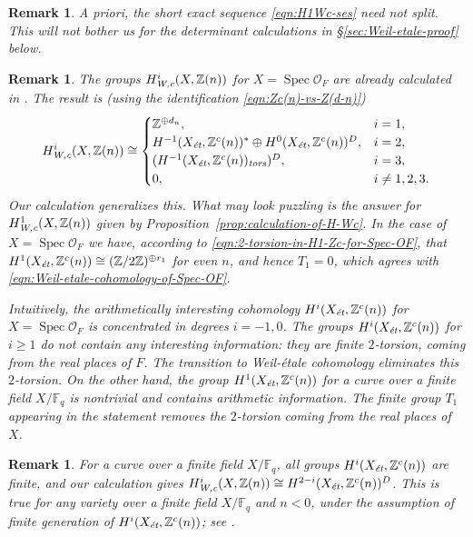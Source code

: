 \documentclass{article}
\DeclareMathOperator{\Spec}{Spec}
\newcommand{\FF}{\mathbb{F}}
\newcommand{\ZZ}{\mathbb{Z}}
\newcommand{\et}{\text{\it \'{e}t}}
\newcommand{\tors}{\text{\it tors}}
\newcommand{\Wc}{\text{\it W,c}}
\theoremstyle{myplain}
\theoremstyle{mydefinition}
\newtheorem{remark}[theorem]{Remark}
\begin{document}
\begin{remark}
  A priori, the short exact sequence \eqref{eqn:H1Wc-ses} need not split.
  This will not bother us for the determinant calculations in
  \S\ref{sec:Weil-etale-proof} below.
\end{remark}

\begin{remark}
  The groups $H^i_\Wc (X, \ZZ(n))$ for $X = \Spec \mathcal{O}_F$ are already
  calculated in \cite[\S 5.8.3]{Flach-Morin-2018}. The result is (using the
  identification \eqref{eqn:Zc(n)-vs-Z(d-n)})
  \begin{equation}
    \label{eqn:Weil-etale-cohomology-of-Spec-OF}
    H^i_\Wc (X, \ZZ(n)) \cong
    \begin{cases}
      \ZZ^{\oplus d_n}, & i = 1, \\
      H^{-1} (X_\et, \ZZ^c (n))^* \oplus H^0 (X_\et, \ZZ^c (n))^D, & i = 2, \\
      (H^{-1} (X_\et, \ZZ^c (n))_\tors)^D, & i = 3, \\
      0, & i \ne 1,2,3.
    \end{cases}
  \end{equation}
  Our calculation generalizes this. What may look puzzling is the answer for
  $H^1_\Wc (X,\ZZ(n))$ given by Proposition~\ref{prop:calculation-of-H-Wc}.
  In the case of $X = \Spec \mathcal{O}_F$ we have, according to
  \eqref{eqn:2-torsion-in-H1-Zc-for-Spec-OF}, that
  $H^1 (X_\et, \ZZ^c(n)) \cong (\ZZ/2\ZZ)^{\oplus r_1}$ for even $n$, and
  hence $T_1 = 0$, which agrees with
  \eqref{eqn:Weil-etale-cohomology-of-Spec-OF}.

  Intuitively, the arithmetically interesting cohomology $H^i (X_\et, \ZZ^c(n))$
  for $X = \Spec \mathcal{O}_F$ is concentrated in degrees $i = -1,0$. The
  groups $H^i (X_\et, \ZZ^c (n))$ for $i \ge 1$ do not contain any interesting
  information: they are finite $2$-torsion, coming from the real places of
  $F$. The transition to Weil-\'{e}tale cohomology eliminates this
  $2$-torsion. On the other hand, the group $H^1 (X_\et, \ZZ^c (n))$ for a curve
  over a finite field $X/\FF_q$ is nontrivial and contains arithmetic
  information. The finite group $T_1$ appearing in the statement removes the
  $2$-torsion coming from the real places of $X$.
\end{remark}

\begin{remark}
  For a curve over a finite field $X/\FF_q$, all groups $H^i (X_\et, \ZZ^c(n))$
  are finite, and our calculation gives
  $H^i_\Wc (X, \ZZ(n)) \cong H^{2-i} (X_\et, \ZZ^c(n))^D$.
  This is true for any variety over a finite field $X/\FF_q$ and $n < 0$, under
  the assumption of finite generation of $H^i (X_\et, \ZZ^c(n))$; see
  \cite[Proposition~7.7]{Beshenov-Weil-etale-1}.
\end{remark}
\end{document}
